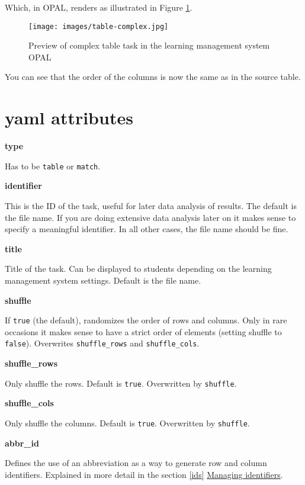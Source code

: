 \documentclass[twoside]{tufte-book}
\begin{document}
Which, in OPAL, renders as illustrated in Figure \ref{tbl2opal}.

\begin{figure}
\centering
\texttt{[image: images/table-complex.jpg]}
\caption{\label{tbl2opal}Preview of complex table task in the learning management system OPAL}
\end{figure}

You can see that the order of the columns is now the same as in the source table.

\section{yaml attributes}\label{yaml-attributes-7}

\noindent\textbf{type}\label{type-7}

Has to be \texttt{table} or \texttt{match}.

\noindent\textbf{identifier}\label{identifier-7}

This is the ID of the task, useful for later data analysis of results. The default is the file name. If you are doing extensive data analysis later on it makes sense to specify a meaningful identifier. In all other cases, the file name should be
fine.

\noindent\textbf{title}\label{title-7}

Title of the task. Can be displayed to students depending on the learning management system settings. Default is the file name.

\noindent\textbf{shuffle}\label{shuffle-4}

If \texttt{true} (the default), randomizes the order of rows and columns. Only in rare occasions it makes sense to have a strict order of elements (setting shuffle to \texttt{false}). Overwrites \texttt{shuffle\_rows} and \texttt{shuffle\_cols}.

\noindent\textbf{shuffle\_rows}\label{shuffle_rows}

Only shuffle the rows. Default is \texttt{true}. Overwritten by \texttt{shuffle}.

\noindent\textbf{shuffle\_cols}\label{shuffle_cols}

Only shuffle the columns. Default is \texttt{true}. Overwritten by \texttt{shuffle}.

\noindent\textbf{abbr\_id}\label{abbr_id-1}

Defines the use of an abbreviation as a way to generate row and column identifiers. Explained in more detail in the section \ref{ids} \hyperref[ids]{Managing identifiers}.
\end{document}
